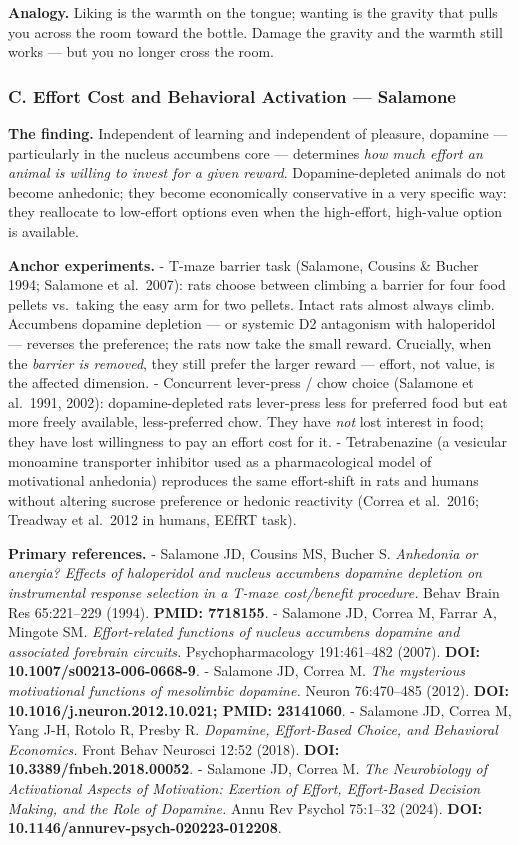 \textbf{Analogy.} Liking is the warmth on the tongue; wanting is the gravity that pulls you across the room toward the bottle. Damage the gravity and the warmth still works --- but you no longer cross the room.

\subsubsection{C. Effort Cost and Behavioral Activation --- Salamone}\label{01_dopamine_substrate-c.-effort-cost-and-behavioral-activation-salamone}

\textbf{The finding.} Independent of learning and independent of pleasure, dopamine --- particularly in the nucleus accumbens core --- determines \emph{how much effort an animal is willing to invest for a given reward}. Dopamine-depleted animals do not become anhedonic; they become economically conservative in a very specific way: they reallocate to low-effort options even when the high-effort, high-value option is available.

\textbf{Anchor experiments.} - T-maze barrier task (Salamone, Cousins \& Bucher 1994; Salamone et al.~2007): rats choose between climbing a barrier for four food pellets vs.~taking the easy arm for two pellets. Intact rats almost always climb. Accumbens dopamine depletion --- or systemic D2 antagonism with haloperidol --- reverses the preference; the rats now take the small reward. Crucially, when the \emph{barrier is removed}, they still prefer the larger reward --- effort, not value, is the affected dimension. - Concurrent lever-press / chow choice (Salamone et al.~1991, 2002): dopamine-depleted rats lever-press less for preferred food but eat more freely available, less-preferred chow. They have \emph{not} lost interest in food; they have lost willingness to pay an effort cost for it. - Tetrabenazine (a vesicular monoamine transporter inhibitor used as a pharmacological model of motivational anhedonia) reproduces the same effort-shift in rats and humans without altering sucrose preference or hedonic reactivity (Correa et al.~2016; Treadway et al.~2012 in humans, EEfRT task).

\textbf{Primary references.} - Salamone JD, Cousins MS, Bucher S. \emph{Anhedonia or anergia? Effects of haloperidol and nucleus accumbens dopamine depletion on instrumental response selection in a T-maze cost/benefit procedure.} Behav Brain Res 65:221--229 (1994). \textbf{PMID: 7718155}. - Salamone JD, Correa M, Farrar A, Mingote SM. \emph{Effort-related functions of nucleus accumbens dopamine and associated forebrain circuits.} Psychopharmacology 191:461--482 (2007). \textbf{DOI: 10.1007/s00213-006-0668-9}. - Salamone JD, Correa M. \emph{The mysterious motivational functions of mesolimbic dopamine.} Neuron 76:470--485 (2012). \textbf{DOI: 10.1016/j.neuron.2012.10.021; PMID: 23141060}. - Salamone JD, Correa M, Yang J-H, Rotolo R, Presby R. \emph{Dopamine, Effort-Based Choice, and Behavioral Economics.} Front Behav Neurosci 12:52 (2018). \textbf{DOI: 10.3389/fnbeh.2018.00052}. - Salamone JD, Correa M. \emph{The Neurobiology of Activational Aspects of Motivation: Exertion of Effort, Effort-Based Decision Making, and the Role of Dopamine.} Annu Rev Psychol 75:1--32 (2024). \textbf{DOI: 10.1146/annurev-psych-020223-012208}.

